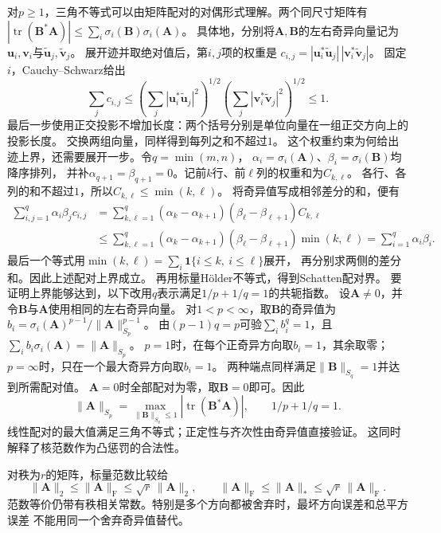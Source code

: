 对$p\geq1$，三角不等式可以由矩阵配对的对偶形式理解。两个同尺寸矩阵有
$|\operatorname{tr}(\bm B^*\bm A)|
\leq\sum_i\sigma_i(\bm B)\sigma_i(\bm A)$。
具体地，分别将$\bm A,\bm B$的左右奇异向量记为
$\bm u_i,\bm v_i$与$\widetilde{\bm u}_j,\widetilde{\bm v}_j$。
展开迹并取绝对值后，第$i,j$项的权重是
$c_{i,j}=|\bm u_i^*\widetilde{\bm u}_j|\,|\bm v_i^*\widetilde{\bm v}_j|$。
固定$i$，Cauchy--Schwarz给出
\[
 \sum_jc_{i,j}\leq
 \left(\sum_j|\bm u_i^*\widetilde{\bm u}_j|^2\right)^{1/2}
 \left(\sum_j|\bm v_i^*\widetilde{\bm v}_j|^2\right)^{1/2}\leq1.
\]
最后一步使用正交投影不增加长度：两个括号分别是单位向量在一组正交方向上的投影长度。
交换两组向量，同样得到每列之和不超过$1$。
这个权重约束为何给出迹上界，还需要展开一步。令$q=\min(m,n)$，
$\alpha_i=\sigma_i(\bm A)$、$\beta_i=\sigma_i(\bm B)$均降序排列，
并补$\alpha_{q+1}=\beta_{q+1}=0$。记前$k$行、前$\ell$列的权重和为$C_{k,\ell}$。
各行、各列的和不超过$1$，所以$C_{k,\ell}\leq\min(k,\ell)$。
将奇异值写成相邻差分的和，便有
\[
 \begin{aligned}
 \sum_{i,j=1}^q\alpha_i\beta_jc_{i,j}
 &=\sum_{k,\ell=1}^q(\alpha_k-\alpha_{k+1})
                      (\beta_\ell-\beta_{\ell+1})C_{k,\ell}\\
 &\leq\sum_{k,\ell=1}^q(\alpha_k-\alpha_{k+1})
                      (\beta_\ell-\beta_{\ell+1})\min(k,\ell)
 =\sum_{i=1}^q\alpha_i\beta_i.
 \end{aligned}
\]
最后一个等式用$\min(k,\ell)=\sum_i\mathbf1\{i\leq k,\ i\leq\ell\}$展开，
再分别求两侧的差分和。因此上述配对上界成立。
再用标量Hölder不等式，得到Schatten配对界。
要证明上界能够达到，以下改用$q$表示满足$1/p+1/q=1$的共轭指数。
设$\bm A\neq0$，并令$\bm B$与$\bm A$使用相同的左右奇异向量。
对$1<p<\infty$，取$\bm B$的奇异值为
$b_i=\sigma_i(\bm A)^{p-1}/\lVert\bm A\rVert_{S_p}^{p-1}$。
由$(p-1)q=p$可验$\sum_i b_i^q=1$，且
$\sum_i b_i\sigma_i(\bm A)=\lVert\bm A\rVert_{S_p}$。
$p=1$时，在每个正奇异方向取$b_i=1$，其余取零；$p=\infty$时，只在一个最大奇异方向取$b_i=1$。
两种端点同样满足$\lVert\bm B\rVert_{S_q}=1$并达到所需配对值。
$\bm A=0$时全部配对为零，取$\bm B=0$即可。因此
\[
 \lVert\bm A\rVert_{S_p}
 =\max_{\lVert\bm B\rVert_{S_q}\leq1}
       |\operatorname{tr}(\bm B^*\bm A)|,\qquad 1/p+1/q=1.
\]
线性配对的最大值满足三角不等式；正定性与齐次性由奇异值直接验证。
这同时解释了核范数作为凸惩罚的合法性。

对秩为$r$的矩阵，标量范数比较给
\begin{equation}
 \lVert\bm A\rVert_2\leq\lVert\bm A\rVert_{\mathrm F}
 \leq\sqrt r\,\lVert\bm A\rVert_2,\qquad
 \lVert\bm A\rVert_{\mathrm F}\leq\lVert\bm A\rVert_*
 \leq\sqrt r\,\lVert\bm A\rVert_{\mathrm F}.
 \label{eq:matrix-analysis-norm-rank-relations}
\end{equation}
范数等价仍带有秩相关常数。特别是多个方向都被舍弃时，最坏方向误差和总平方误差
不能用同一个舍弃奇异值替代。


